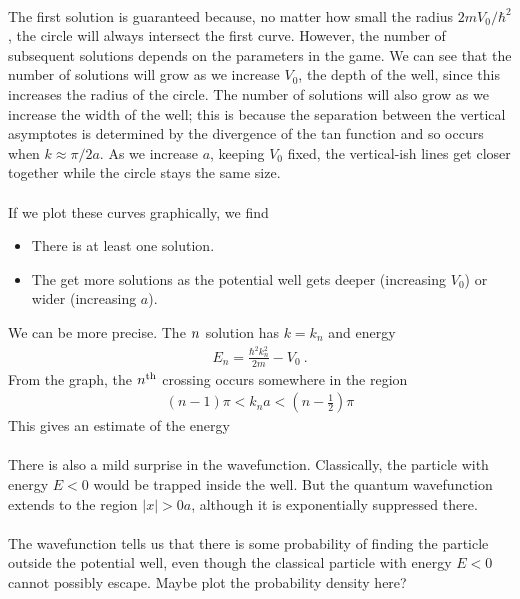 \documentclass[12pt]{article}
\def\be{\begin{eqnarray}}
\def\ee{\end{eqnarray}}
\newcommand{\nn}{\nonumber}
\newcommand\para{\paragraph{}}
\newcommand{\co}{\color{olive}}
\newcommand{\cblue}{\color{blue}}
\begin{document}
\para
The first solution is guaranteed because, no matter how small the radius $2mV_0/\hbar^2$, the circle will always intersect the first curve. However, the number of subsequent solutions depends on the parameters in the game. We can see that the number of solutions will grow as we increase $V_0$, the depth of the well, since this increases the radius of the circle. The number of solutions will also grow as we increase the width of the well; this is because the separation between the vertical asymptotes is determined by the divergence of the tan function and so occurs when $k\approx \pi/2a$. As we increase $a$, keeping $V_0$ fixed, the vertical-ish lines get closer together while the  circle stays the same size.







\para
{\co 
If we plot these curves graphically, we find
%
\begin{itemize}
\item There is at least one solution.
\item The get more solutions as the potential well gets deeper (increasing $V_0$) or wider (increasing $a$). 
\end{itemize}
We can be more precise. The $n^{\rm}$ solution has $k=k_n$ and energy
%
\be E_n = \frac{\hbar^2k_n^2}{2m}-V_0\ .\label{enwindy}\nn\ee
%
From the graph, the $n^{\rm th}$ crossing occurs somewhere in the region
%
\be (n-1)\pi < k_na < \left(n-\frac{1}{2}\right)\pi\nn\ee
%
This gives an estimate of the energy
}

\para
There is also a mild surprise in the wavefunction. Classically, the particle with energy $E<0$ would be trapped inside the well. But the quantum wavefunction extends to the region $|x|>0a$, although it is exponentially suppressed there. 

\para
{\co The wavefunction tells us that there is some probability of finding the particle outside the potential well, even though the classical particle with energy $E<0$ cannot possibly escape.} {\cblue Maybe plot the probability density here?}
\end{document}
